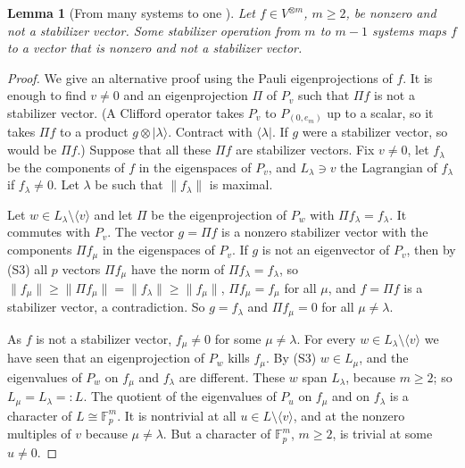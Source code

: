 \documentclass[11pt]{article}
\newtheorem{lemma}[theorem]{Lemma}
\theoremstyle{definition}
\newcommand{\ket}[1]{|#1\rangle}
\newcommand{\bra}[1]{\langle#1|}
\newcommand{\F}{\mathbb F}
\begin{document}
\begin{lemma}[From many systems to one {\cite[Appendix B]{Reichardt}}]\label{lem:reduce}
Let $f\in V^{\otimes m}$, $m\ge2$, be nonzero and not a stabilizer vector. Some stabilizer operation from $m$ to $m-1$ systems maps $f$ to a vector that is nonzero and not a stabilizer vector.
\end{lemma}
\begin{proof}
We give an alternative proof using the Pauli eigenprojections of $f$.
It is enough to find $v\ne0$ and an eigenprojection $\Pi$ of $P_v$ such that $\Pi f$ is not a stabilizer vector. (A Clifford operator takes $P_v$ to $P_{(0,e_m)}$ up to a scalar, so it takes $\Pi f$ to a product $g\otimes\ket\lambda$. Contract with $\bra\lambda$. If $g$ were a stabilizer vector, so would be $\Pi f$.) Suppose that all these $\Pi f$ are stabilizer vectors.
Fix $v\ne0$, let $f_\lambda$ be the components of $f$ in the eigenspaces of $P_v$, and $L_\lambda\ni v$ the Lagrangian of $f_\lambda$ if $f_\lambda\ne0$. Let $\lambda$ be such that $\|f_\lambda\|$ is maximal.

Let $w\in L_\lambda\setminus\langle v\rangle$ and let $\Pi$ be the eigenprojection of $P_w$ with $\Pi f_\lambda=f_\lambda$. It commutes with $P_v$. The vector $g=\Pi f$ is a nonzero stabilizer vector with the components $\Pi f_\mu$ in the eigenspaces of $P_v$. If $g$ is not an eigenvector of $P_v$, then by (S3) all $p$ vectors $\Pi f_\mu$ have the norm of $\Pi f_\lambda=f_\lambda$,
so $\|f_\mu\|\ge\|\Pi f_\mu\|=\|f_\lambda\|\ge\|f_\mu\|$, $\Pi f_\mu=f_\mu$ for all $\mu$, and $f=\Pi f$ is a stabilizer vector, a contradiction. So $g=f_\lambda$ and $\Pi f_\mu=0$ for all $\mu\ne\lambda$.

As $f$ is not a stabilizer vector, $f_\mu\ne0$ for some $\mu\ne\lambda$. For every $w\in L_\lambda\setminus\langle v\rangle$ we have seen that an eigenprojection of $P_w$ kills $f_\mu$. By (S3) $w\in L_\mu$, and the eigenvalues of $P_w$ on $f_\mu$ and $f_\lambda$ are different. These $w$ span $L_\lambda$, because $m\ge2$; so $L_\mu=L_\lambda=:L$.
The quotient of the eigenvalues of $P_u$ on $f_\mu$ and on $f_\lambda$ is a character of $L\cong\F_p^m$. It is nontrivial at all $u\in L\setminus\langle v\rangle$, and at the nonzero multiples of $v$ because $\mu\ne\lambda$. But a character of $\F_p^m$, $m\ge2$, is trivial at some $u\ne0$.
\end{proof}
\end{document}
